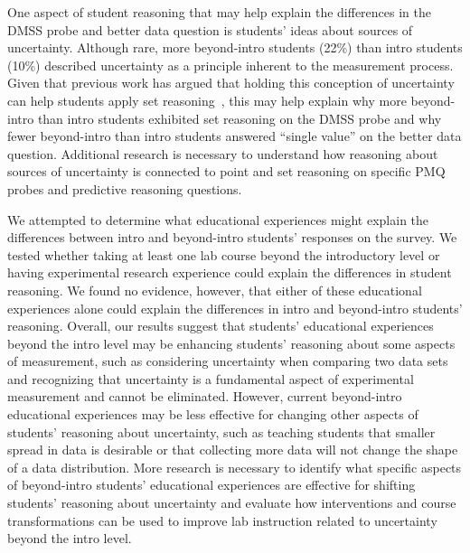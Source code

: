 \documentclass[english,aps,prstper,reprint,showpacs,longbibliography,superscriptaddress,nofootinbib]{revtex4-2}
\begin{document}
One aspect of student reasoning that may help explain the differences in the DMSS probe and better data question is students' ideas about sources of uncertainty. Although rare, more beyond-intro students (22\%) than intro students (10\%) described uncertainty as a principle inherent to the measurement process. Given that previous work has argued that holding this conception of uncertainty can help students apply set reasoning~\cite{Evangelinos1999,Evangelinos2002,Allie2003,Pillay2008,Buffler2008}, this may help explain why more beyond-intro than intro students exhibited set reasoning on the DMSS probe and why fewer beyond-intro than intro students answered ``single value'' on the better data question. Additional research is necessary to understand how reasoning about sources of uncertainty is connected to point and set reasoning on specific PMQ probes and predictive reasoning questions.

We attempted to determine what educational experiences might explain the differences between intro and beyond-intro students' responses on the survey. We tested whether taking at least one lab course beyond the introductory level or having experimental research experience could explain the differences in student reasoning. We found no evidence, however, that either of these educational experiences alone could explain the differences in intro and beyond-intro students' reasoning. Overall, our results suggest that students' educational experiences beyond the intro level may be enhancing students' reasoning about some aspects of measurement, such as considering uncertainty when comparing two data sets and recognizing that uncertainty is a fundamental aspect of experimental measurement and cannot be eliminated. However, current beyond-intro educational experiences may be less effective for changing other aspects of students' reasoning about uncertainty, such as teaching students that smaller spread in data is desirable or that collecting more data will not change the shape of a data distribution. More research is necessary to identify what specific aspects of beyond-intro students' educational experiences are effective for shifting students' reasoning about uncertainty and evaluate how interventions and course transformations can be used to improve lab instruction related to uncertainty beyond the intro level.
 
\end{document}
